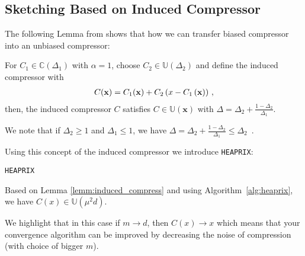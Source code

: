 \subsection{Sketching Based on Induced Compressor}
The following Lemma from \cite{horvath2020better} shows that how we can transfer biased compressor into an unbiased compressor: 
\begin{lemma}\label{lemm:induced_compress}
For $C_1\in \mathbb{C}(\Delta_1)$ with $\alpha=1$, choose $C_2\in \mathbb{U}(\Delta_2)$ and define the induced compressor with
\begin{align}\notag
    C(\mathbf{x})=C_1(\mathbf{x})+C_2\left(x-C_1\left(\mathbf{x}\right)\right)\, ,
\end{align}
then, the induced compressor $C$ satisfies $C\in\mathbb{U}(\mathbf{x})$ with $\Delta=\Delta_2+\frac{1-\Delta_2}{\Delta_1}$.
\end{lemma}
\begin{remark}
We note that if $\Delta_2\geq 1$ and $\Delta_1\leq 1$, we have $\Delta=\Delta_2+\frac{1-\Delta_2}{\Delta_1}\leq \Delta_2$\, .
\end{remark}
Using this concept of the induced compressor we introduce \texttt{HEAPRIX}:
\begin{algorithm}[H]
\caption{\texttt{HEAPRIX} }\label{alg:heaprix}
\begin{algorithmic}[1]
\end{algorithmic}
\end{algorithm}


\begin{corollary}
Based on Lemma \ref{lemm:induced_compress} and using Algorithm~\ref{alg:heaprix}, we have $C(x)\in \mathbb{U}(\mu^2 d)$.
\end{corollary}
\begin{remark}
We highlight that in this case if $m\rightarrow d$, then $C(x)\rightarrow x$ which means that your convergence algorithm can be improved by decreasing the noise of compression (with choice of bigger $m$). 
\end{remark}

